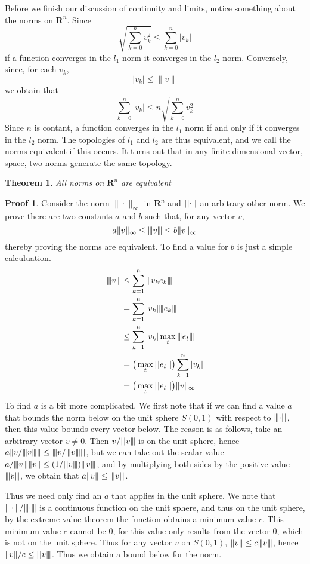 \documentclass[12pt]{amsbook}
\theoremstyle{plain}
\newtheorem{theorem}{Theorem}
\theoremstyle{definition}
\newtheorem*{prf}{Proof}
\newcommand{\tripnorm}[1]{{\left\vert\kern-0.25ex\left\vert\kern-0.25ex\left\vert #1 
    \right\vert\kern-0.25ex\right\vert\kern-0.25ex\right\vert}}
\begin{document}
Before we finish our discussion of continuity and limits, notice something about the norms on $\mathbf{R}^n$. Since
%
\[ \sqrt{\sum_{k = 0}^n v_k^2} \leq \sum_{k = 0}^n |v_k| \]
%
if a function converges in the $l_1$ norm it converges in the $l_2$ norm. Conversely, since, for each $v_k$,
%
\[ |v_k| \leq \|v\| \]
%
we obtain that
%
\[ \sum_{k = 0}^n |v_k| \leq n \sqrt{\sum_{k = 0}^n v_k^2} \]
%
Since $n$ is contant, a function converges in the $l_1$ norm if and only if it converges in the $l_2$ norm. The topologies of $l_1$ and $l_2$ are thus equivalent, and we call the norms equivalent if this occurs. It turns out that in any finite dimensional vector, space, two norms generate the same topology.

\begin{theorem}All norms on $\mathbf{R}^n$ are equivalent\end{theorem}
\begin{prf}
  Consider the norm $\| \cdot \|_{\infty}$ in $\mathbf{R}^n$ and $\tripnorm{ \cdot }$ an arbitrary other norm. We prove there are two constants $a$ and $b$ such that, for any vector $v$,
  \[ a\|v\|_{\infty} \leq \tripnorm{v} \leq b\|v\|_{\infty} \]
  thereby proving the norms are equivalent. To find a value for $b$ is just a simple calculuation.
  \begin{align*}
    \tripnorm{v} &\leq \sum_{k = 1}^n \tripnorm{v_ke_k}\\
                 &= \sum_{k = 1}^n |v_k| \tripnorm{e_k}\\
                 &\leq \sum_{k = 1}^n |v_k| \max_{t} \tripnorm{e_t}\\
                 &= \big( \max_{t} \tripnorm{e_t} \big) \sum_{k = 1}^n |v_k|\\
                 &= \big ( \max_{t} \tripnorm{e_t} \big) \| v \|_{\infty}
  \end{align*}
  To find $a$ is a bit more complicated. We first note that if we can find a value $a$ that bounds the norm below on the unit sphere $S(0,1)$ with respect to $\tripnorm{\cdot}$, then this value bounds every vector below. The reason is as follows, take an arbitrary vector $v \neq 0$. Then $v/\tripnorm{v}$ is on the unit sphere, hence $a\|v/\tripnorm{v}\| \leq \tripnorm{v/\tripnorm{v}}$, but we can take out the scalar value $a/\tripnorm{v} \|v\| \leq (1/\tripnorm{v}) \tripnorm{v}$, and by multiplying both sides by the positive value $\tripnorm{v}$, we obtain that $a \| v \| \leq \tripnorm{v}$.

  Thus we need only find an $a$ that applies in the unit sphere. We note that $\| \cdot \|/\tripnorm{\cdot}$ is a continuous function on the unit sphere, and thus on the unit sphere, by the extreme value theorem the function obtains a minimum value $c$. This minimum value $c$ cannot be 0, for this value only results from the vector $0$, which is not on the unit sphere. Thus for any vector $v$ on $S(0,1)$, $\| v \| \leq c \tripnorm{v} $, hence $\| v \| / c \leq \tripnorm{v}$. Thus we obtain a bound below for the norm.
\end{prf}
\end{document}
